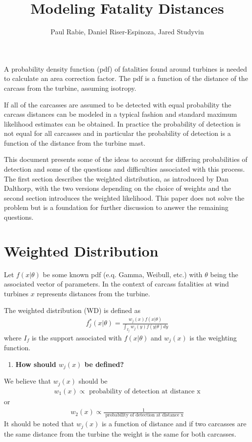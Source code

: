 \documentclass{westarticle}
\title{Modeling Fatality Distances}
\author{Paul Rabie, Daniel Riser-Espinoza, Jared Studyvin}
\begin{document}
\westtitle
\doublespace
A probability density function (pdf) of fatalities found around turbines is
needed to calculate an area correction factor. The pdf is a function
of the distance of the carcass from the turbine, assuming isotropy.

If all of the carcasses are assumed to be detected with equal
probability the carcass distances can be modeled in a typical
fashion and standard maximum likelihood estimates can be obtained. In
practice the probability of detection is not equal for all carcasses
and in particular the probability of detection is a function of the
distance from the turbine mast.

This document presents some of the ideas to account for differing
probabilities of detection and some of the questions and difficulties
associated with this process. The first section describes the weighted
distribution, as introduced by Dan Dalthorp, with the two versions
depending on the choice of weights  and the second section introduces the weighted
likelihood. This paper does not solve the problem but is a foundation
for further discussion to answer the remaining questions.

\section{Weighted Distribution}

Let $f(x|\theta)$ be some known pdf (e.q. Gamma, Weibull, etc.) with
$\theta$ being the associated vector of parameters. In the context of
carcass fatalities at wind turbines $x$ represents distances from the
turbine.

The weighted distribution (WD) is defined as
\begin{align}
  \label{eq:fstar}
f_j^*(x|\theta) = \frac{w_j(x)f(x|\theta)}{\int_{I_f} w_j(y)f(y|\theta)dy}
\end{align}
where $I_f$ is the support associated with $f(x|\theta)$ and
$w_j(x)$ is the weighting function.


\begin{enumerate}[label=\bf{Q\arabic*:}]
\item \bf{How should $w_j(x)$ be defined?}
\end{enumerate}


We believe that $w_j(x)$ should be 
\begin{align}
  \label{eq:w}
  w_1(x) \propto \mbox{ probability of detection at distance x}
\end{align}
or
\begin{align}
  \label{eq:inversew}
  w_2(x) \propto \frac{1}{\mbox{ probability of detection at distance x}}
\end{align}
It should be noted that $w_j(x)$ is a function of
distance and if two carcasses are the same distance from the turbine
the weight is the same for both carcasses.
\end{document}
